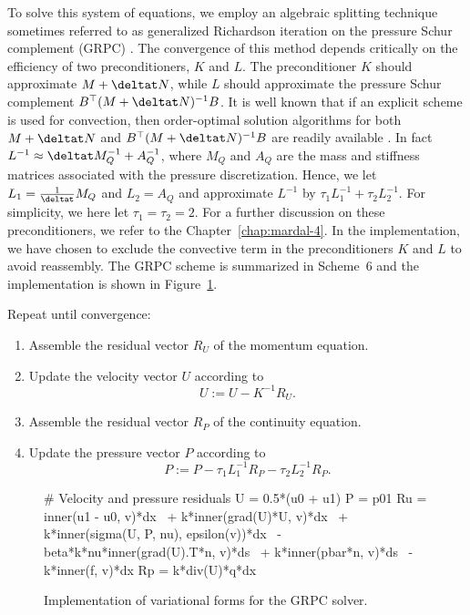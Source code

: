 To solve this system of equations, we employ an algebraic splitting
technique sometimes referred to as generalized Richardson iteration on
the pressure Schur complement (GRPC) \citep{Turek1999}. The
convergence of this method depends critically on the efficiency of two
preconditioners, $K$ and $L$. The preconditioner $K$ should
approximate $M + \deltat N$, while $L$ should approximate the
pressure Schur complement $B^{\top} (M + \deltat N)^{-1} B$. It is well
known that if an explicit scheme is used for convection, then
order-optimal solution algorithms for both $M + \deltat N$ and $B^{\top} (M
+ \deltat N)^{-1} B$ are readily available
\citep{CahouetChabard1988,Turek1999,MardalWinther2004,MardalWinther11}. In
fact $L^{-1} \approx \deltat M_Q^{-1} + A_Q^{-1}$, where $M_Q$ and
$A_Q$ are the mass and stiffness matrices associated with the pressure
discretization. Hence, we let $L_1=\frac{1}{\deltat} M_Q$ and
$L_2=A_Q$ and approximate $L^{-1}$ by $\tau_1 L_1^{-1} + \tau_2
L_2^{-1}$. For simplicity, we here let $\tau_1 = \tau_2 = 2$.  For a
further discussion on these preconditioners, we refer to the
Chapter~\ref{chap:mardal-4}. In the implementation, we have chosen to
exclude the convective term in the preconditioners $K$ and $L$ to
avoid reassembly.  The GRPC scheme is summarized in Scheme~6 and the
implementation is shown in Figure~\ref{fig:grpc_code}.

{
\item
  Repeat until convergence:

  \begin{enumerate}
  \item
    Assemble the residual vector $R_U$ of the momentum equation.
  \item
    Update the velocity vector $U$ according to
    \begin{equation}\label{eq:grpc,1}
      U := U - K^{-1} R_U.
    \end{equation}
  \item
    Assemble the residual vector $R_P$ of the continuity equation.
  \item
    Update the pressure vector $P$ according to
    \begin{equation}\label{eq:grpc,2}
      P := P - \tau_1 L_1^{-1} R_P - \tau_2 L_2^{-1} R_P.
    \end{equation}
  \end{enumerate}
}

\begin{figure}
  \begin{center}
    \begin{python}
# Velocity and pressure residuals
U = 0.5*(u0 + u1)
P = p01
Ru = inner(u1 - u0, v)*dx \
   + k*inner(grad(U)*U, v)*dx \
   + k*inner(sigma(U, P, nu), epsilon(v))*dx \
   - beta*k*nu*inner(grad(U).T*n, v)*ds \
   + k*inner(pbar*n, v)*ds \
   - k*inner(f, v)*dx
Rp = k*div(U)*q*dx
    \end{python}
    \caption{Implementation of variational forms for the GRPC solver.}
    \label{fig:grpc_code}
  \end{center}
\end{figure}

